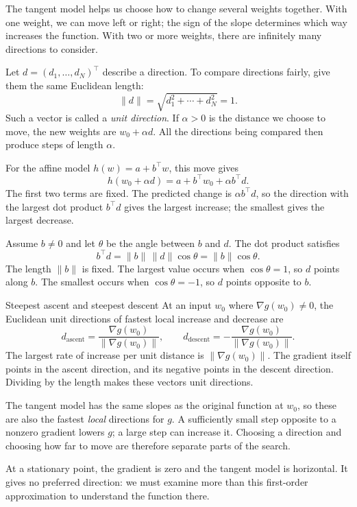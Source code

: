\documentclass[a4paper,12pt,oneside]{report}
\begin{document}
The tangent model helps us choose how to change several weights
together. With one weight, we can move left or right; the sign of
the slope determines which way increases the function. With two
or more weights, there are infinitely many directions to consider.

Let $d=(d_1,\ldots,d_N)^\top$ describe a direction. To compare
directions fairly, give them the same Euclidean length:
\[
  \|d\|=\sqrt{d_1^2+\cdots+d_N^2}=1.
\]
Such a vector is called a \emph{unit direction}. If $\alpha>0$ is
the distance we choose to move, the new weights are $w_0+\alpha d$.
All the directions being compared then produce steps of length
$\alpha$.

For the affine model $h(w)=a+b^\top w$, this move gives
\[
  h(w_0+\alpha d)=a+b^\top w_0+\alpha b^\top d.
\]
The first two terms are fixed. The predicted change is
$\alpha b^\top d$, so the direction with the largest dot product
$b^\top d$ gives the largest increase; the smallest gives the largest
decrease.

Assume $b\ne0$ and let $\theta$ be the angle between $b$ and $d$.
The dot product satisfies
\[
  b^\top d=\|b\|\,\|d\|\cos\theta=\|b\|\cos\theta.
\]
The length $\|b\|$ is fixed. The largest value occurs when
$\cos\theta=1$, so $d$ points along $b$. The smallest occurs when
$\cos\theta=-1$, so $d$ points opposite to $b$.

\begin{frameddefn}{Steepest ascent and steepest descent}\label{def:steepest-directions}
At an input $w_0$ where $\nabla g(w_0)\ne0$, the Euclidean unit
directions of fastest local increase and decrease are
\[
  d_{\mathrm{ascent}}=
  \frac{\nabla g(w_0)}{\|\nabla g(w_0)\|},\qquad
  d_{\mathrm{descent}}=
  -\frac{\nabla g(w_0)}{\|\nabla g(w_0)\|}.
\]
The largest rate of increase per unit distance is $\|\nabla g(w_0)\|$.
The gradient itself points in the ascent direction, and its negative
points in the descent direction. Dividing by the length makes these
vectors unit directions.
\end{frameddefn}

The tangent model has the same slopes as the original function at
$w_0$, so these are also the fastest \emph{local} directions for $g$.
A sufficiently small step opposite to a nonzero gradient lowers $g$;
a large step can increase it. Choosing a direction and choosing how
far to move are therefore separate parts of the search.

At a stationary point, the gradient is zero and the tangent model
is horizontal. It gives no preferred direction: we must examine more
than this first-order approximation to understand the function there.
\end{document}
